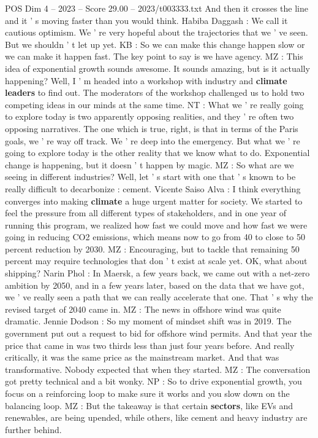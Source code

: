 \begin{textsample}{POS Dim 4 – 2023 – Score 29.00 – 2023/t003333.txt}
And then it crosses the line and it ' s moving faster than you would think.
Habiba Daggash : We call it cautious optimism.
We ' re very hopeful about the trajectories that we ' ve seen.
But we shouldn ' t let up yet.
KB : So we can make this change happen slow or we can make it happen fast.
The key point to say is we have agency.
MZ : This idea of exponential growth sounds awesome.
It sounds amazing, but is it actually happening?
Well, I ' m headed into a workshop with industry and \textbf{climate} \textbf{leaders} to find out.
The moderators of the workshop challenged us to hold two competing ideas in our minds at the same time.
NT : What we ' re really going to explore today is two apparently opposing realities, and they ' re often two opposing narratives.
The one which is true, right, is that in terms of the Paris goals, we ' re way off track.
We ' re deep into the emergency.
But what we ' re going to explore today is the other reality that we know what to do.
Exponential change is happening, but it doesn ' t happen by magic.
MZ : So what are we seeing in different industries?
Well, let ' s start with one that ' s known to be really difficult to decarbonize : cement.
Vicente Saiso Alva : I think everything converges into making \textbf{climate} a huge urgent matter for society.
We started to feel the pressure from all different types of stakeholders, and in one year of running this program, we realized how fast we could move and how fast we were going in reducing CO2 emissions, which means now to go from 40 to close to 50 percent reduction by 2030.
MZ : Encouraging, but to tackle that remaining 50 percent may require technologies that don ' t exist at scale yet.
OK, what about shipping?
Narin Phol : In Maersk, a few years back, we came out with a net-zero ambition by 2050, and in a few years later, based on the data that we have got, we ' ve really seen a path that we can really accelerate that one.
That ' s why the revised target of 2040 came in.
MZ : The news in offshore wind was quite dramatic.
Jennie Dodson : So my moment of mindset shift was in 2019.
The government put out a request to bid for offshore wind permits.
And that year the price that came in was two thirds less than just four years before.
And really critically, it was the same price as the mainstream market.
And that was transformative.
Nobody expected that when they started.
MZ : The conversation got pretty technical and a bit wonky.
NP : So to drive exponential growth, you focus on a reinforcing loop to make sure it works and you slow down on the balancing loop.
MZ : But the takeaway is that certain \textbf{sectors}, like EVs and renewables, are being upended, while others, like cement and heavy industry are further behind.

\end{textsample}
